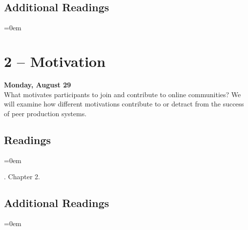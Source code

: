 \documentclass[11pt]{memoir}
\newenvironment{readinglist}{
\begin{list}{}{\leftmargin=8pt \itemindent=0em}
  \setlength{\itemsep}{8pt}
  \setlength{\parskip}{0em}
  \setlength{\parsep}{1em}
  \setlength{\parindent}{8em}}
{\end{list}}
\begin{document}
    \subsection{Additional Readings}
    \begin{readinglist}
        \item {}
        \item {}
        \item {}
        \item {}
    \end{readinglist}

\section{2 -- Motivation}
\textcolor{CUGold}{\textbf{Monday, August 29}}\\
What motivates participants to join and contribute to online communities? We will examine how different motivations contribute to or detract from the success of peer production systems. 

    \subsection{Readings}
    \begin{readinglist}
        \item {}
        \item {}. Chapter 2.
        \item {}
    \end{readinglist}
    
    \subsection{Additional Readings}
    \begin{readinglist}
        \item {}
        \item {}
        \item {}
        \item {}
        \item {}
        \item {}
    \end{readinglist}
\end{document}
